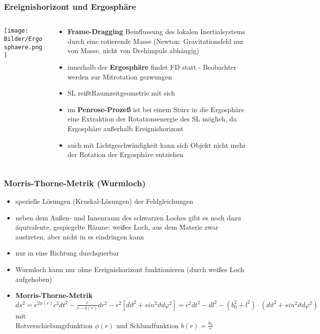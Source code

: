 \documentclass{beamer}
\begin{document}
\begin{frame}\frametitle{Ereignishorizont und Ergosphäre}

\begin{columns}

\begin{column}{.48\textwidth}

\texttt{[image: Bilder/Ergosphaere.png]}

\end{column}

\hfill

\begin{column}{.48\textwidth}

{\fontsize{8}{10} \selectfont

\begin{itemize}
\item \textbf{Frame-Dragging} Beinflussung des lokalen Inertialsystems durch eine rotierende Masse (Newton: Gravitationsfeld nur von Masse, nicht von Drehimpuls abhängig)
\item innerhalb der \textbf{Ergosphäre} findet FD statt - Beobachter werden zur Mitrotation gezwungen
\item SL \glqq reißt\grqq Raumzeitgeometrie mit sich
\item im \textbf{Penrose-Prozeß} ist bei einem Sturz in die Ergosphäre eine Extraktion der Rotationsenergie des SL möglich, da Ergosphäre außerhalb Ereignishorizont
\item auch mit Lichtgeschwindigkeit kann sich Objekt nicht mehr der Rotation der Ergosphäre entziehen
\end{itemize}

}

\end{column}

\end{columns}

\end{frame}

\begin{frame}\frametitle{Morris-Thorne-Metrik (Wurmloch)}

\begin{itemize}
\item spezielle Lösungen (Kruskal-Lösungen) der Feldgleichungen
\item neben dem Außen- und Innenraum des schwarzen Loches gibt es noch dazu äquivalente, gespiegelte Räume: \glqq weißes Loch\grqq, aus dem Materie zwar austreten, aber nicht in es eindringen kann
\item nur in eine Richtung durchquerbar
\item Wurmloch kann nur ohne Ereignishorizont funktionieren (durch weißes Loch aufgehoben)
\item \textbf{Morris-Thorne-Metrik} $ds^2 = e^{2\phi(r)} c^2 dt^2 - \frac{r}{r - b(r)} dr^2 - r^2[d\vartheta^2 + sin^2\vartheta d\varphi^2] = c^2 dt^2 - dl^2 - (b_0^2 + l^2)\cdot (d\vartheta^2 + sin^2\vartheta d\varphi^2)$ mit\\
Rotverschiebungsfunktion $\phi(r)$ und Schlundfunktion $b(r) = \frac{b_0}{r}$
\end{itemize}

\end{frame}
\end{document}
